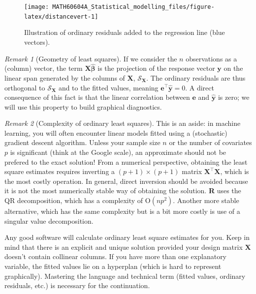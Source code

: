 \documentclass[
  11pt,
  letterpaper,
]{book}
\theoremstyle{definition}
\theoremstyle{definition}
\theoremstyle{definition}
\theoremstyle{remark}
\newtheorem*{remark}{Remark}
\begin{document}
\begin{figure}

{\centering \texttt{[image: MATH60604A\_Statistical\_modelling\_files/figure-latex/distancevert-1]} 

}

\caption{Illustration of ordinary residuals added to the regression line (blue vectors).}\label{fig:distancevert}
\end{figure}

\begin{remark}[Geometry of least squares]
{}If we consider the \(n\) observations as a (column) vector, the term \(\mathbf{X} \widehat{\boldsymbol{\beta}}\) is the projection of the response vector \(\boldsymbol{y}\) on the linear span generated by the columns of \(\mathbf{X}\), \(\mathscr{S}_{\mathbf{X}}\). The ordinary residuals are thus orthogonal to \(\mathscr{S}_{\mathbf{X}}\) and to the fitted values, meaning \(\boldsymbol{e}^\top\widehat{\boldsymbol{y}}=0\).
A direct consequence of this fact is that the linear correlation between \(\boldsymbol{e}\) and \(\widehat{\boldsymbol{y}}\) is zero; we will use this property to build graphical diagnostics.
\end{remark}

\begin{remark}[Complexity of ordinary least squares]
{}This is an aside: in machine learning, you will often encounter linear models fitted using a (stochastic) gradient descent algorithm. Unless your sample size \(n\) or the number of covariates \(p\) is significant (think at the Google scale), an approximate should not be prefered to the exact solution! From a numerical perspective, obtaining the least square estimates requires inverting a \((p+1) \times (p+1)\) matrix \(\mathbf{X}^\top\mathbf{X}\), which is the most costly operation. In general, direct inversion should be avoided because it is not the most numerically stable way of obtaining the solution. \textbf{R} uses the QR decomposition, which has a complexity of \(\mathrm{O}(np^2)\). Another more stable alternative, which has the same complexity but is a bit more costly is use of a singular value decomposition.
\end{remark}

Any good software will calculate ordinary least square estimates for you. Keep in mind that there is an explicit and unique solution provided your design matrix \(\mathbf{X}\) doesn't contain collinear columns. If you have more than one explanatory variable, the fitted values lie on a hyperplan (which is hard to represent graphically). Mastering the language and technical term (fitted values, ordinary residuals, etc.) is necessary for the continuation.
\end{document}
